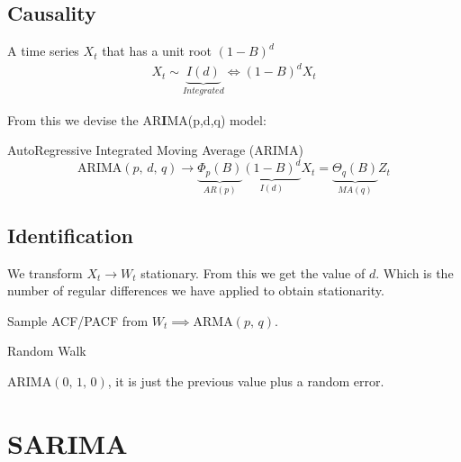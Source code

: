 \subsection{Causality}

A time series $X_t$ that has a unit root $(1 - B)^d$
\begin{align*}
	X_t \sim \underbrace{I(d)}_{Integrated} \iff (1 - B)^d X_t
	\tag{Stationary (Casual)}
\end{align*}

From this we devise the AR\textbf{I}MA(p,d,q) model:

\begin{definition}{AutoRegressive Integrated Moving Average (ARIMA)}{}
	\begin{equation*}
		\text{ARIMA}(p,\,d,\,q) \longrightarrow{} \underbrace{\Phi_p(B)}_{AR(p)}
		\underbrace{(1-B)^d}_{I(d)}
		X_t =
		\underbrace{\Theta_q(B)}_{MA(q)}
		Z_t
	\end{equation*}
\end{definition}

\subsection{Identification}

We transform $X_t \longrightarrow{} W_t$ stationary.
From this we get the value of $d$. Which is the
number of regular differences we have applied to obtain
stationarity.

Sample ACF/PACF from $W_t \implies \text{ARMA}(p,\,q)$.

\begin{definition}{Random Walk}{}

	$\text{ARIMA}(0,\,1,\,0)$, it is just the previous
	value plus a random error.

	\begin{figure}[H]
	\end{figure}

\end{definition}

\section{SARIMA}

